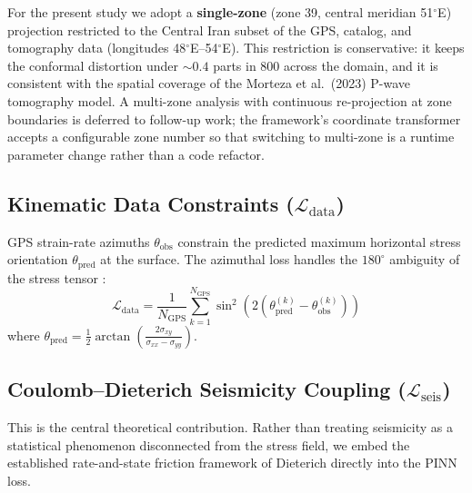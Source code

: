 \documentclass[11pt, a4paper]{article}
\begin{document}
For the present study we adopt a \textbf{single-zone} (zone 39, central meridian 51$^\circ$E) projection restricted to the Central Iran subset of the GPS, catalog, and tomography data (longitudes 48$^\circ$E--54$^\circ$E). This restriction is conservative: it keeps the conformal distortion under $\sim 0.4$ parts in 800 across the domain, and it is consistent with the spatial coverage of the Morteza et al.\ (2023) P-wave tomography model. A multi-zone analysis with continuous re-projection at zone boundaries is deferred to follow-up work; the framework's coordinate transformer accepts a configurable zone number so that switching to multi-zone is a runtime parameter change rather than a code refactor.

\subsection{Kinematic Data Constraints ($\mathcal{L}_{\text{data}}$)}
GPS strain-rate azimuths $\theta_{\text{obs}}$ constrain the predicted maximum horizontal stress orientation $\theta_{\text{pred}}$ at the surface. The azimuthal loss handles the $180^\circ$ ambiguity of the stress tensor \cite{Heidbach2018}:
\begin{equation}
    \mathcal{L}_{\text{data}} = \frac{1}{N_{\text{GPS}}} \sum_{k=1}^{N_{\text{GPS}}} \sin^2\!\left(2\left(\theta_{\text{pred}}^{(k)} - \theta_{\text{obs}}^{(k)}\right)\right)
    \label{eq:data_loss}
\end{equation}
where $\theta_{\text{pred}} = \frac{1}{2}\arctan\!\left(\frac{2\sigma_{xy}}{\sigma_{xx} - \sigma_{yy}}\right)$.

\subsection{Coulomb--Dieterich Seismicity Coupling ($\mathcal{L}_{\text{seis}}$)}

This is the central theoretical contribution. Rather than treating seismicity as a statistical phenomenon disconnected from the stress field, we embed the established rate-and-state friction framework of Dieterich \cite{Dieterich1994} directly into the PINN loss.
\end{document}
